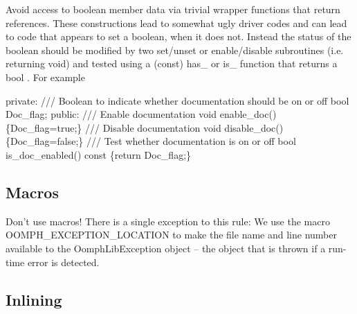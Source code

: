 \begin{DoxyItemize}
\item Avoid access to boolean member data via trivial wrapper functions that return references. These constructions lead to somewhat ugly driver codes and can lead to code that appears to set a boolean, when it does not. Instead the status of the boolean should be modified by two set/unset or enable/disable subroutines (i.\-e. returning void) and tested using a (const) has\-\_\- or is\-\_\- function that returns a bool . For example 
\begin{DoxyCode}
\textcolor{keyword}{private}:\textcolor{comment}{}
\textcolor{comment}{  /// Boolean to indicate whether documentation should be on or off}
\textcolor{comment}{}  \textcolor{keywordtype}{bool} Doc\_flag;
\textcolor{keyword}{public}:\textcolor{comment}{}
\textcolor{comment}{  /// Enable documentation}
\textcolor{comment}{}  \textcolor{keywordtype}{void} enable\_doc() \{Doc\_flag=\textcolor{keyword}{true};\}\textcolor{comment}{}
\textcolor{comment}{  /// Disable documentation}
\textcolor{comment}{}  \textcolor{keywordtype}{void} disable\_doc() \{Doc\_flag=\textcolor{keyword}{false};\}\textcolor{comment}{}
\textcolor{comment}{  /// Test whether documentation is on or off}
\textcolor{comment}{}  \textcolor{keywordtype}{bool} is\_doc\_enabled()\textcolor{keyword}{ const }\{\textcolor{keywordflow}{return} Doc\_flag;\}
\end{DoxyCode}

\end{DoxyItemize}\hypertarget{index_dont_use_macros}{}\subsection{Macros}\label{index_dont_use_macros}

\begin{DoxyItemize}
\item Don't use macros! There is a single exception to this rule\-: We use the macro {\ttfamily O\-O\-M\-P\-H\-\_\-\-E\-X\-C\-E\-P\-T\-I\-O\-N\-\_\-\-L\-O\-C\-A\-T\-I\-O\-N} to make the file name and line number available to the {\ttfamily Oomph\-Lib\-Exception} object -- the object that is thrown if a run-\/time error is detected.
\end{DoxyItemize}\hypertarget{index_inlining}{}\subsection{Inlining}\label{index_inlining}


